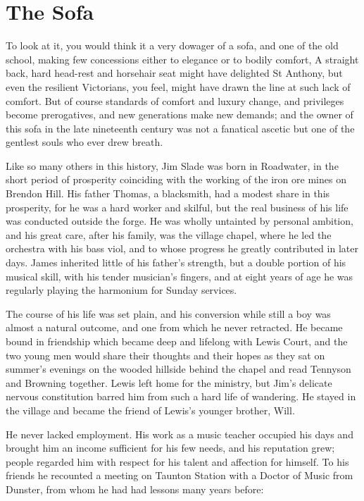 \section{The Sofa}

To look at it, you would think it a very dowager of a sofa, and one of the old school, making few concessions either to elegance or to bodily comfort, A straight back, hard head-rest and horsehair seat might have delighted St Anthony, but even the resilient Victorians, you feel, might have drawn the line at such lack of comfort. But of course standards of comfort and luxury change, and privileges become prerogatives, and new generations make new demands; and the owner of this sofa in the late nineteenth century was not a fanatical ascetic but one of the gentlest souls who ever drew breath.

Like so many others in this history, Jim Slade was born in Roadwater, in the short period of prosperity coinciding with the working of the iron ore mines on Brendon Hill. His father Thomas, a blacksmith, had a modest share in this prosperity, for he was a hard worker and skilful, but the real business of his life was conducted outside the forge. He was wholly untainted by personal ambition, and his great care, after his family, was the village chapel, where he led the orchestra with his bass viol, and to whose progress he greatly contributed in later days. James inherited little of his father's strength, but a double portion of his musical skill, with his tender musician's fingers, and at eight years of age he was regularly playing the harmonium for Sunday services.

The course of his life was set plain, and his conversion while still a boy was almost a natural outcome, and one from which he never retracted. He became bound in friendship which became deep and lifelong with Lewis Court, and the two young men would share their thoughts and their hopes as they sat on summer's evenings on the wooded hillside behind the chapel and read Tennyson and Browning together. Lewis left home for the ministry, but Jim's delicate nervous constitution barred him from such a hard life of wandering. He stayed in the village and became the friend of Lewis's younger brother, Will.

He never lacked employment. His work as a music teacher occupied his days and brought him an income sufficient for his few needs, and his reputation grew; people regarded him with respect for his talent and affection for himself. To his friends he recounted a meeting on Taunton Station with a Doctor of Music from Dunster, from whom he had had lessons many years before:

